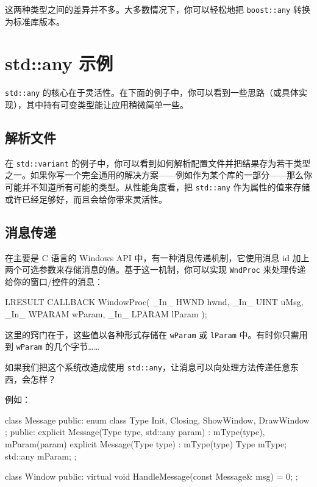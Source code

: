 这两种类型之间的差异并不多。大多数情况下，你可以轻松地把 \texttt{boost::any} 转换为标准库版本。


\section{std::any 示例}

\texttt{std::any} 的核心在于灵活性。在下面的例子中，你可以看到一些思路（或具体实现），其中持有可变类型能让应用稍微简单一些。


\subsection{解析文件}

在 \texttt{std::variant} 的例子中，你可以看到如何解析配置文件并把结果存为若干类型之一。如果你写一个完全通用的解决方案——例如作为某个库的一部分——那么你可能并不知道所有可能的类型。从性能角度看，把 \texttt{std::any} 作为属性的值来存储或许已经足够好，而且会给你带来灵活性。


\subsection{消息传递}

在主要是 C 语言的 Windows API 中，有一种消息传递机制，它使用消息 id 加上两个可选参数来存储消息的值。基于这一机制，你可以实现 \texttt{WndProc} 来处理传递给你的窗口/控件的消息：

\begin{codebox}[cpp]
LRESULT CALLBACK WindowProc(
_In_ HWND
hwnd,
_In_ UINT
uMsg,
_In_ WPARAM wParam,
_In_ LPARAM lParam
);
\end{codebox}

这里的窍门在于，这些值以各种形式存储在 \texttt{wParam} 或 \texttt{lParam} 中。有时你只需用到 \texttt{wParam} 的几个字节……

如果我们把这个系统改造成使用 \texttt{std::any}，让消息可以向处理方法传递任意东西，会怎样？

例如：

\begin{codebox}[cpp]
class Message
{
public:
enum class Type
{
Init,
Closing,
ShowWindow,
DrawWindow
};
public:
explicit Message(Type type, std::any param) :
mType(type),
mParam(param)
{
}
explicit Message(Type type) :
mType(type)
{
}
Type mType;
std::any mParam;
};
\end{codebox}

\begin{codebox}[cpp]
class Window
{
public:
virtual void HandleMessage(const Message& msg) = 0;
};
\end{codebox}

